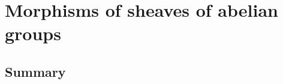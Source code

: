 

\vskip 0.5cm
\section{Morphisms of sheaves of abelian groups}


\renewcommand{\theenumi}{\roman{enumi}}
\renewcommand{\labelenumi}{\textnormal{(\theenumi)}$\;\;$}


\subsection{Summary}
\setcounter{theorem}{0}
\setcounter{equation}{0}


